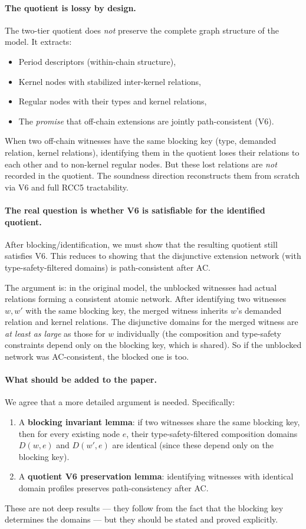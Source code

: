 \documentclass[11pt]{article}
\begin{document}
\paragraph{The quotient is lossy by design.}
The two-tier quotient does \emph{not} preserve the complete graph structure
of the model.  It extracts:
\begin{itemize}
\item Period descriptors (within-chain structure),
\item Kernel nodes with stabilized inter-kernel relations,
\item Regular nodes with their types and kernel relations,
\item The \emph{promise} that off-chain extensions are jointly
  path-consistent (V6).
\end{itemize}
When two off-chain witnesses have the same blocking key (type, demanded
relation, kernel relations), identifying them in the quotient loses their
relations to each other and to non-kernel regular nodes.  But these lost
relations are \emph{not} recorded in the quotient.  The soundness
direction reconstructs them from scratch via V6 and full RCC5
tractability.

\paragraph{The real question is whether V6 is satisfiable for the identified quotient.}
After blocking/identification, we must show that the resulting quotient
still satisfies V6.  This reduces to showing that the disjunctive
extension network (with type-safety-filtered domains) is path-consistent
after AC.

The argument is: in the original model, the unblocked witnesses had
actual relations forming a consistent atomic network.  After identifying
two witnesses $w, w'$ with the same blocking key, the merged witness
inherits $w$'s demanded relation and kernel relations.  The disjunctive
domains for the merged witness are \emph{at least as large} as those for
$w$ individually (the composition and type-safety constraints depend only
on the blocking key, which is shared).  So if the unblocked network was
AC-consistent, the blocked one is too.

\paragraph{What should be added to the paper.}
We agree that a more detailed argument is needed.  Specifically:
\begin{enumerate}
\item A \textbf{blocking invariant lemma}: if two witnesses share the
  same blocking key, then for every existing node $e$, their
  type-safety-filtered composition domains $D(w, e)$ and $D(w', e)$
  are identical (since these depend only on the blocking key).
\item A \textbf{quotient V6 preservation lemma}: identifying witnesses
  with identical domain profiles preserves path-consistency after AC.
\end{enumerate}
These are not deep results --- they follow from the fact that the blocking
key determines the domains --- but they should be stated and proved
explicitly.
\end{document}
